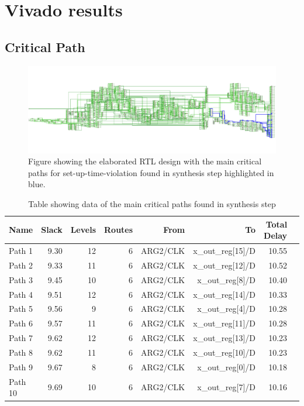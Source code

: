 \chapter{Vivado results}

\section{Critical Path}
\begin{figure}[H]
    \centering
    \includegraphics[width=\textwidth]{./images/Vivado/setup_synthesis.pdf}
    \caption{Figure showing the elaborated RTL design with the main critical paths for set-up-time-violation found in synthesis step highlighted in blue.}
    \label{fig:setup_synthesis}
\end{figure}

\begin{table}[ht]
    \centering
    \small
    \captionsetup{skip=10pt} 
    \begin{tabular}{lrrrrrrr}
        \hline
        Name &  Slack &  Levels &  Routes & From      & To                 & Total Delay    \\
        \hline
        Path 1 &   9.30 &      12 &       6 & ARG2/CLK  & x\_out\_reg[15]/D  &        10.55  \\
        Path 2 &   9.33 &      11 &       6 & ARG2/CLK  & x\_out\_reg[12]/D  &        10.52  \\
        Path 3 &   9.45 &      10 &       6 & ARG2/CLK  &  x\_out\_reg[8]/D  &        10.40  \\
        Path 4 &   9.51 &      12 &       6 & ARG2/CLK  & x\_out\_reg[14]/D  &        10.33  \\
        Path 5 &   9.56 &       9 &       6 & ARG2/CLK  &  x\_out\_reg[4]/D  &        10.28  \\
        Path 6 &   9.57 &      11 &       6 & ARG2/CLK  & x\_out\_reg[11]/D  &        10.28  \\
        Path 7 &   9.62 &      12 &       6 & ARG2/CLK  & x\_out\_reg[13]/D  &        10.23  \\
        Path 8 &   9.62 &      11 &       6 & ARG2/CLK  & x\_out\_reg[10]/D  &        10.23  \\
        Path 9 &   9.67 &       8 &       6 & ARG2/CLK  &  x\_out\_reg[0]/D  &        10.18  \\
        Path 10 &   9.69 &      10 &       6 & ARG2/CLK  &  x\_out\_reg[7]/D  &       10.16  \\
        \hline
    \end{tabular}
    \caption{Table showing data of the main critical paths found in synthesis step}
    \label{tab:setup_synthesis}
\end{table}
    

